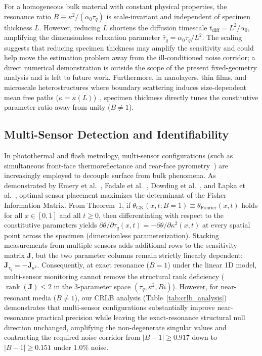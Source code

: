 \documentclass[preprint,12pt]{elsarticle}
\begin{document}
For a homogeneous bulk material with constant physical properties, the resonance ratio $B \equiv \kappa^2 / (\alpha_0 \tau_q)$ is scale-invariant and independent of specimen thickness $L$. However, reducing $L$ shortens the diffusion timescale $t_{\mathrm{diff}} = L^2 / \alpha_0$, amplifying the dimensionless relaxation parameter $\hat{\tau}_q = \alpha_0 \tau_q / L^2$. The scaling suggests that reducing specimen thickness may amplify the sensitivity and could help move the estimation problem away from the ill-conditioned noise corridor; a direct numerical demonstration is outside the scope of the present fixed-geometry analysis and is left to future work. Furthermore, in nanolayers, thin films, and microscale heterostructures where boundary scattering induces size-dependent mean free paths ($\kappa = \kappa(L)$)~\cite{alvarez2007memory,guo2015phonon,minnich2012determining,cahill2014nanoscale,sellitto2016mesoscopic,sellitto2025nonlinear,zhu2017nonlocal}, specimen thickness directly tunes the constitutive parameter ratio away from unity ($B \ne 1$).

\subsection{Multi-Sensor Detection and Identifiability}

In photothermal and flash metrology, multi-sensor configurations (such as simultaneous front-face thermoreflectance and rear-face pyrometry~\cite{salazar2014extending}) are increasingly employed to decouple surface from bulk phenomena. As demonstrated by Emery et al.~\cite{emery2000uncertainties}, Fadale et al.~\cite{fadale1995two}, Dowding et al.~\cite{dowding1995estimation}, and {\L}apka et al.~\cite{lapka2020development}, optimal sensor placement maximizes the determinant of the Fisher Information Matrix. From Theorem~1, if $\theta_{\mathrm{GK}}(x, t; B=1) \equiv \theta_{\mathrm{Fourier}}(x, t)$ holds for all $x \in [0, 1]$ and all $t \ge 0$, then differentiating with respect to the constitutive parameters yields $\partial \theta / \partial \tau_q(x, t) = -\partial \theta / \partial \kappa^2(x, t)$ at every spatial point across the specimen (dimensionless parameterization). Stacking measurements from multiple sensors adds additional rows to the sensitivity matrix $\bm{J}$, but the two parameter columns remain strictly linearly dependent: $\bm{J}_{\tau_q} = -\bm{J}_{\kappa^2}$. Consequently, at exact resonance ($B = 1$) under the linear 1D model, multi-sensor monitoring cannot remove the structural rank deficiency ($\operatorname{rank}(\bm{J}) \le 2$ in the 3-parameter space $(\tau_q, \kappa^2, Bi)$). However, for near-resonant media ($B \ne 1$), our CRLB analysis (Table~\ref{tab:crlb_analysis}) demonstrates that multi-sensor configurations substantially improve near-resonance practical precision while leaving the exact-resonance structural null direction unchanged, amplifying the non-degenerate singular values and contracting the required noise corridor from $|B-1| \ge 0.917$ down to $|B-1| \ge 0.151$ under $1.0\%$ noise.
\end{document}
